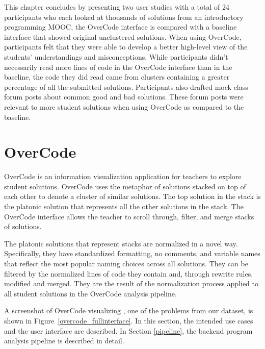 This chapter concludes by presenting two user studies with a total of 24 participants who each looked at thousands of solutions from an introductory programming MOOC, the OverCode interface is compared with a baseline interface that showed original unclustered solutions. When using OverCode, participants felt that they were able to develop a better high-level view of the students' understandings and misconceptions. While participants didn't necessarily read more lines of code in the OverCode interface than in the baseline, the code they did read came from clusters containing a greater percentage of all the submitted solutions. Participants also drafted mock class forum posts about common good and bad solutions. These forum posts were relevant to more student solutions when using OverCode as compared to the baseline. 

\section{OverCode} \label{overcode}
OverCode is an information visualization application for teachers to explore student solutions. OverCode uses the metaphor of solutions stacked on top of each other to denote a cluster of similar solutions. The top solution in the stack is the platonic solution that represents all the other solutions in the stack. The OverCode interface allows the teacher to scroll through, filter, and merge stacks of solutions. 

The platonic solutions that represent stacks are normalized in a novel way. Specifically, they have standardized formatting, no comments, and variable names that reflect the most popular naming choices across all solutions. They can be filtered by the normalized lines of code they contain and, through rewrite rules, modified and merged. They are the result of the normalization process applied to all student solutions in the OverCode analysis pipeline. %

A screenshot of OverCode visualizing , one of the problems from our dataset, is shown in Figure~\ref{overcode_fullinterface}. In this section, the intended use cases and the user interface are described. In Section \ref{pipeline}, the backend program analysis pipeline is described in detail. 
